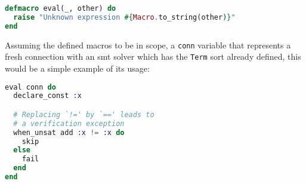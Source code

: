 \begin{lstlisting}[language=elixir,numbers=none,frame=none]
defmacro eval(_, other) do
  raise "Unknown expression #{Macro.to_string(other)}"
end
\end{lstlisting}

Assuming the defined macros to be in scope, a \verb|conn| variable that
represents a fresh connection with an \acrshort{smt} solver which
has the \verb|Term| sort already defined, this would be a simple example
of its usage:

\begin{lstlisting}[language=elixir,numbers=none,frame=none]
eval conn do
  declare_const :x

  # Replacing `!=' by `==' leads to 
  # a verification exception
  when_unsat add :x != :x do
    skip
  else
    fail
  end
end
\end{lstlisting}
